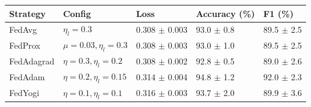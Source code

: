 \begin{tabular}{lllll}
\toprule
Strategy & Config & Loss & Accuracy (\%) & F1 (\%) \\
\midrule
FedAvg & $\eta_l=0.3$ & 0.308 $\pm$ 0.003 & 93.0 $\pm$ 0.8 & 89.5 $\pm$ 2.5 \\
FedProx & $\mu=0.03, \eta_l=0.3$ & 0.308 $\pm$ 0.003 & 93.0 $\pm$ 1.0 & 89.5 $\pm$ 2.5 \\
FedAdagrad & $\eta=0.3, \eta_l=0.2$ & 0.308 $\pm$ 0.002 & 92.8 $\pm$ 0.5 & 89.0 $\pm$ 2.6 \\
FedAdam & $\eta=0.2, \eta_l=0.15$ & 0.314 $\pm$ 0.004 & 94.8 $\pm$ 1.2 & 92.0 $\pm$ 2.3 \\
FedYogi & $\eta=0.1, \eta_l=0.1$ & 0.316 $\pm$ 0.003 & 93.7 $\pm$ 2.0 & 89.9 $\pm$ 3.6 \\
\bottomrule
\end{tabular}
